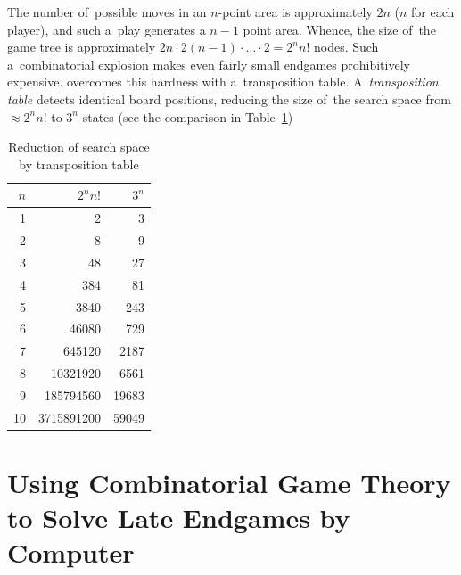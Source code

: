 The number of~possible moves in an $n$-point area is approximately $2n$ ($n$ for each player), and such a~play generates a $n-1$ point area.
Whence, the size of~the game tree is approximately $2n\cdot2(n-1)\cdot \ldots \cdot2 = 2^n n!$ nodes.
Such a~combinatorial explosion makes even fairly small endgames prohibitively expensive.
\Mueller{} overcomes this hardness with a~transposition table.
A~\emph{transposition table} detects identical board positions, reducing the size of~the search space from $\approx 2^n n!$ to $3^n$ states (see the comparison in Table~\ref{tab:reduction-transp-tab})
\begin{table}[!htbp]
  \centering
  \begin{tabular}{ |rrr| }
    \hline
    \textbf{$n$} & \textbf{$2^nn!$} & \textbf{$3^n$} \\
    \hline
    1	&	2	&	3 \\ 
    2	&	8	&	9 \\ 
    3	&	48	&	27 \\ 
    4	&	384	&	81 \\ 
    5	&	3840	&	243 \\ 
    6	&	46080	&	729 \\ 
    7	&	645120	&	2187 \\ 
    8	&	10321920	&	6561 \\ 
    9	&	185794560	&	19683 \\ 
    10	&	3715891200	&	59049 \\ 
    \hline
  \end{tabular}
  \caption{Reduction of search space by transposition table}
  \label{tab:reduction-transp-tab}
\end{table}

\section{Using Combinatorial Game Theory to Solve Late Endgames by Computer}

